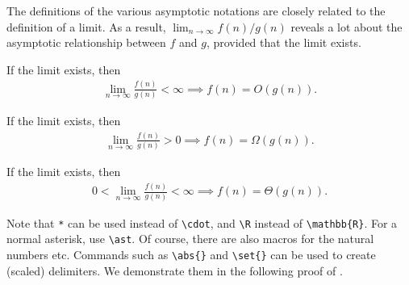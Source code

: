 \documentclass{homework}
\begin{document}
The definitions of the various asymptotic notations are closely related to the definition of a limit. As a result, $\lim_{n \to \infty} f(n) / g(n)$ reveals a lot about the asymptotic relationship between $f$ and $g$, provided that the limit exists.

\begin{lemma}
    If the limit exists, then
    \begin{align*}
        \lim_{n \to \infty} \frac{f(n)}{g(n)} < \infty \implies f(n) = O(g(n)).
    \end{align*}
\end{lemma}

\begin{lemma}
    If the limit exists, then
    \begin{align*}
        \lim_{n \to \infty} \frac{f(n)}{g(n)} > 0 \implies f(n) = \Omega(g(n)).
    \end{align*}
\end{lemma}

\begin{lemma}
    If the limit exists, then
    \begin{align*}
        0 < \lim_{n \to \infty} \frac{f(n)}{g(n)} < \infty \implies f(n) = \Theta(g(n)).
    \end{align*}
\end{lemma}

Note that \texttt{*} can be used instead of \verb|\cdot|, and \verb|\R| instead of \verb|\mathbb{R}|. For a normal asterisk, use \verb|\ast|. Of course, there are also macros for the natural numbers etc. Commands such as \verb|\abs{}| and \verb|\set{}| can be used to create (scaled) delimiters. We demonstrate them in the following proof of .
\end{document}

